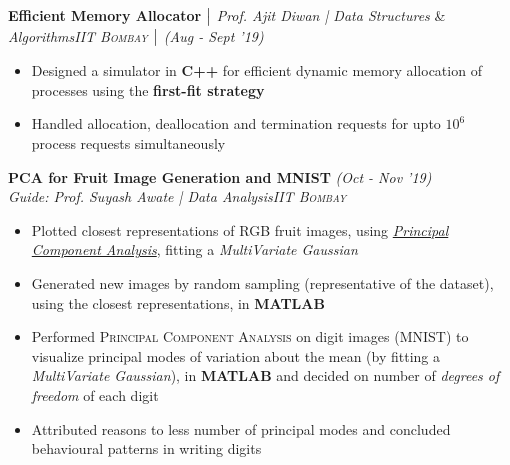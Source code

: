 \documentclass{article}
\begin{document}
\vspace{-5pt}
\textbf{Efficient Memory Allocator} $\bigm|$ {\it Prof. Ajit Diwan | Data Structures} \& {\it Algorithms}\hfill{\sl \small \textsc{IIT Bombay} $\bigm|$ (Aug - Sept '19)}\\
\vspace{-19pt}
\begin{itemize}[itemsep = -1 mm, leftmargin=*]
  \item Designed a simulator in \textbf{C++} for efficient dynamic memory allocation of processes using the \textbf{first-fit strategy}
   \item Handled allocation, deallocation and termination requests for upto $10^{\text{6}}$ process requests simultaneously
\end{itemize}
\vspace{-5pt}
\textbf{PCA for Fruit Image Generation and MNIST} \hfill{\sl \small (Oct - Nov '19)}\\{\it Guide: Prof. Suyash Awate | Data Analysis}\hfill{\sl \small \textsc{IIT Bombay}}\\
\vspace{-19pt}
\begin{itemize}[itemsep = -1 mm, leftmargin=*]
   \item Plotted closest representations of RGB fruit images, using \textit{\underline{Principal Component Analysis}}, fitting a \textit{MultiVariate Gaussian}
    \item Generated new images by random sampling (representative of the dataset), using the closest representations, in \textbf{MATLAB}
    \item Performed \textsc{Principal Component Analysis} on digit images (MNIST) to visualize principal modes of variation about the mean (by fitting a \textit {MultiVariate Gaussian}), in \textbf{MATLAB} and decided on number of \textit{degrees of freedom} of each digit
    \item Attributed reasons to less number of principal modes and concluded behavioural patterns in writing digits
\end{itemize}
\end{document}
